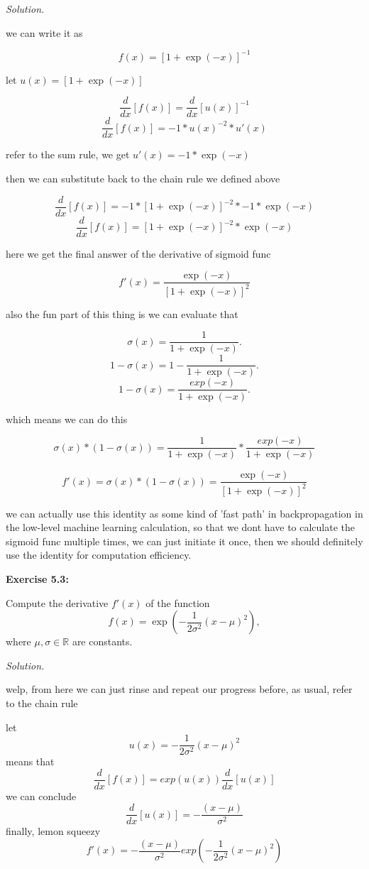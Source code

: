 \documentclass[12pt, a4paper]{article}
\newcommand{\R}{\mathbb{R}}        %
\newenvironment{problem}[1][Problem]{\noindent\textbf{#1:}\par\vspace{0.5em}}{\vspace{1em}}
\newenvironment{solution}{\noindent\textit{Solution.}\par\vspace{0.5em}}{\vspace{2em}}
\begin{document}
\begin{solution}
  we can write it as

  \[f(x) = [1 + \exp(-x)]^{-1}\]
  
  let $u(x) = [1 + \exp(-x)]$

  \vspace{0.5em}

  \[ \frac{d}{dx}[f(x)] = \frac{d}{dx}[u(x)]^{-1}\]
  \[ \frac{d}{dx}[f(x)] = -1 * u(x)^{-2} * u'(x)\]
  
  refer to the sum rule, we get $u'(x) = -1 * \exp(-x)$

  \vspace{0.5em}
  
  then we can substitute back to the chain rule we defined above

  \[\frac{d}{dx}[f(x)] = -1 * [1 + \exp(-x)]^{-2} * -1 * \exp(-x)\]
  \[\frac{d}{dx}[f(x)] = [1 + \exp(-x)]^{-2} * \exp(-x)\]
  
  here we get the final answer of the derivative of sigmoid func

  \[f'(x) = \frac{\exp(-x)}{[1 + \exp(-x)]^2}\]

  also the fun part of this thing is we can evaluate that

  \[\sigma(x) = \frac{1}{1 + \exp(-x)}.\]
  \[1 - \sigma(x) = 1- \frac{1}{1 + \exp(-x)}.\]
  \[1 - \sigma(x) = \frac{exp(-x)}{1 + \exp(-x)}.\]

  which means we can do this

  \[\sigma(x) * (1 - \sigma(x)) = \frac{1}{1 + \exp(-x)} * \frac{exp(-x)}{1 + \exp(-x)} \]

  \[ f'(x) = \sigma(x) * (1 - \sigma(x)) = \frac{\exp(-x)}{[1 + \exp(-x)]^2} \]

  we can actually use this identity as some kind of 'fast path' in backpropagation in the low-level machine learning calculation, so that we dont have to calculate the sigmoid func multiple times, we can just initiate it once,
  then we should definitely use the identity for computation efficiency.

\end{solution}
\newpage


\begin{problem}[Exercise 5.3]
  Compute the derivative $f'(x)$ of the function
  \[
    f(x) = \exp\left(-\frac{1}{2\sigma^2}(x - \mu)^2\right),
  \]
  where $\mu, \sigma \in \R$ are constants.
\end{problem}

\begin{solution}
  welp, from here we can just rinse and repeat our progress before, as usual, refer to the chain rule

  let \[u(x) = -\frac{1}{2\sigma^2}(x - \mu)^2 \]
  means that
  \[ \frac{d}{dx}[f(x)] = exp(u(x))\frac{d}{dx}[u(x)]\]
  we can conclude
   \[\frac{d}{dx}[u(x)] = -\frac{(x-\mu)}{\sigma^{2}}\]
  finally, lemon squeezy
  \[ f'(x) = -\frac{(x-\mu)}{\sigma^{2}}exp(-\frac{1}{2\sigma^2}(x - \mu)^2)\]

\end{solution}
\newpage
\end{document}
